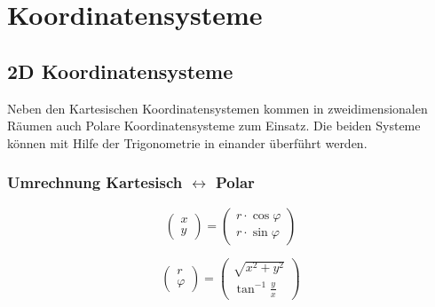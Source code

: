\columnbreak
\section{Koordinatensysteme}
\subsection{2D Koordinatensysteme}
Neben den Kartesischen Koordinatensystemen kommen in zweidimensionalen Räumen auch Polare Koordinatensysteme zum Einsatz.
Die beiden Systeme können mit Hilfe der Trigonometrie in einander überführt werden.

\subsubsection{Umrechnung Kartesisch $\leftrightarrow$ Polar}
\begin{minipage}{0.29\linewidth}
    \[
    \begin{pmatrix}
        x \\
        y
    \end{pmatrix}
    =
    \begin{pmatrix}
        r \cdot \cos{\varphi}\\
        r \cdot \sin{\varphi}
    \end{pmatrix}
    \]
\end{minipage}
\hfill
\begin{minipage}{0.29\linewidth}
    \[
    \begin{pmatrix}
        r \\
        \varphi
    \end{pmatrix}
    =
    \begin{pmatrix}
        \sqrt{x^2+y^2}\\
        \tan^{-1}{\frac{y}{x}}
    \end{pmatrix}
    \]
\end{minipage}
\hfill
\begin{minipage}{0.29\linewidth}
    \begin{center}
    \end{center}
\end{minipage}


